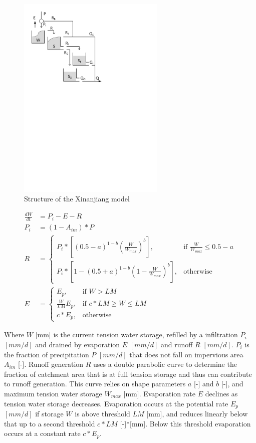 { 																	%
\begin{figure}
\includegraphics[trim=1cm 17cm 7cm 1cm,width=7cm,keepaspectratio]{./AppA_files/28_schematic.pdf}
\caption{Structure of the Xinanjiang model} \label{fig:28_schematic}
\end{figure}

\begin{align}
	\frac{dW}{dt} &= P_i-E-R \\
	P_i &= (1-A_{im})*P \\
	R &= 
	\begin{cases}
		P_i * \left[(0.5-a)^{1-b}\left(\frac{W}{W_{max}}\right)^b\right] , & \text{if } \frac{W}{W_{max}} \leq 0.5-a \\
		P_i * \left[1-(0.5+a)^{1-b}\left(1-\frac{W}{W_{max}}\right)^b\right] , & \text{otherwise}
	\end{cases} \\
	E &= \begin{cases}
		E_p , & \text{if } W > LM \\
		\frac{W}{LM}E_p , & \text{if } c*LM \geq W \leq LM \\
		c*E_p , & \text{otherwise}
	\end{cases}
\end{align}

} %
\vspace{2cm}
Where $W$ [mm] is the current tension water storage, refilled by a infiltration $P_i$ $[mm/d]$ and drained by evaporation $E$ $[mm/d]$ and runoff $R$ $[mm/d]$.
$P_i$ is the fraction of precipitation $P$ $[mm/d]$ that does not fall on impervious area $A_{im}$ [-].
Runoff generation $R$ uses a double parabolic curve to determine the fraction of catchment area that is at full tension storage and thus can contribute to runoff generation. 
This curve relies on shape parameters $a$ [-] and $b$ [-], and maximum tension water storage $W_{max}$ [mm].
Evaporation rate $E$ declines as tension water storage decreases.
Evaporation occurs at the potential rate $E_p$ $[mm/d]$ if storage $W$ is above threshold $LM$ [mm], and reduces linearly below that up to a second threshold $c*LM$ [-]*[mm].
Below this threshold evaporation occurs at a constant rate $c*E_p$.

